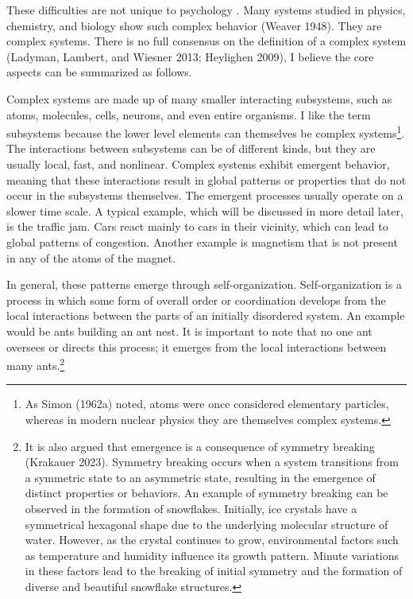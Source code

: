 \documentclass[
  a4paper,
  DIV=11,
  numbers=noendperiod,
  oneside]{scrreprt}
\begin{document}
These difficulties are not unique to psychology . Many systems studied
in physics, chemistry, and biology show such complex behavior (Weaver
1948). They are complex systems. There is no full consensus on the
definition of a complex system (Ladyman, Lambert, and Wiesner 2013;
Heylighen 2009), I believe the core aspects can be summarized as
follows.

Complex systems are made up of many smaller interacting subsystems, such
as atoms, molecules, cells, neurons, and even entire organisms. I like
the term subsystems because the lower level elements can themselves be
complex systems\footnote{As Simon (1962a) noted, atoms were once
  considered elementary particles, whereas in modern nuclear physics
  they are themselves complex systems.}. The interactions between
subsystems can be of different kinds, but they are usually local, fast,
and nonlinear. Complex systems exhibit emergent behavior, meaning that
these interactions result in global patterns or properties that do not
occur in the subsystems themselves. The emergent processes usually
operate on a slower time scale. A typical example, which will be
discussed in more detail later, is the traffic jam. Cars react mainly to
cars in their vicinity, which can lead to global patterns of congestion.
Another example is magnetism that is not present in any of the atoms of
the magnet.

In general, these patterns emerge through self-organization.
Self-organization is a process in which some form of overall order or
coordination develops from the local interactions between the parts of
an initially disordered system. An example would be ants building an ant
nest. It is important to note that no one ant oversees or directs this
process; it emerges from the local interactions between many
ants.\footnote{It is also argued that emergence is a consequence of
  symmetry breaking (Krakauer 2023). Symmetry breaking occurs when a
  system transitions from a symmetric state to an asymmetric state,
  resulting in the emergence of distinct properties or behaviors. An
  example of symmetry breaking can be observed in the formation of
  snowflakes. Initially, ice crystals have a symmetrical hexagonal shape
  due to the underlying molecular structure of water. However, as the
  crystal continues to grow, environmental factors such as temperature
  and humidity influence its growth pattern. Minute variations in these
  factors lead to the breaking of initial symmetry and the formation of
  diverse and beautiful snowflake structures.}
\end{document}
